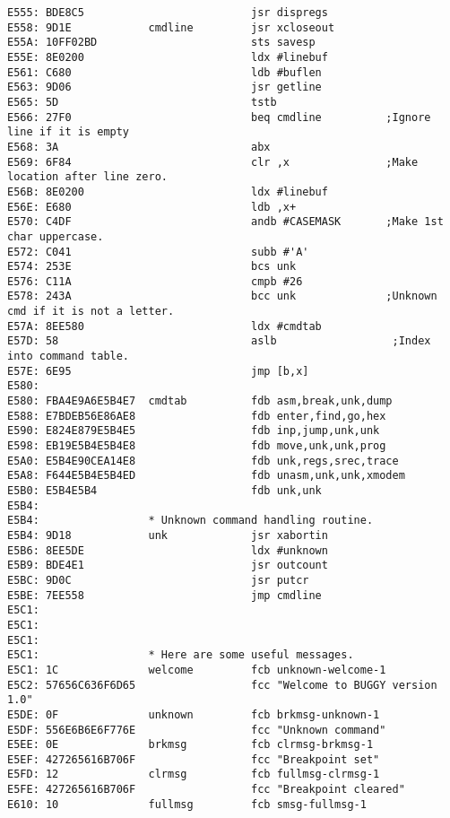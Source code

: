 {\begin{verbatim}
E555: BDE8C5                          jsr dispregs         
E558: 9D1E            cmdline         jsr xcloseout
E55A: 10FF02BD                        sts savesp
E55E: 8E0200                          ldx #linebuf
E561: C680                            ldb #buflen
E563: 9D06                            jsr getline
E565: 5D                              tstb
E566: 27F0                            beq cmdline          ;Ignore line if it is empty
E568: 3A                              abx
E569: 6F84                            clr ,x               ;Make location after line zero.
E56B: 8E0200                          ldx #linebuf
E56E: E680                            ldb ,x+
E570: C4DF                            andb #CASEMASK       ;Make 1st char uppercase.
E572: C041                            subb #'A'            
E574: 253E                            bcs unk
E576: C11A                            cmpb #26
E578: 243A                            bcc unk              ;Unknown cmd if it is not a letter.
E57A: 8EE580                          ldx #cmdtab
E57D: 58                              aslb                  ;Index into command table.
E57E: 6E95                            jmp [b,x]
E580:                 
E580: FBA4E9A6E5B4E7  cmdtab          fdb asm,break,unk,dump
E588: E7BDEB56E86AE8                  fdb enter,find,go,hex
E590: E824E879E5B4E5                  fdb inp,jump,unk,unk
E598: EB19E5B4E5B4E8                  fdb move,unk,unk,prog
E5A0: E5B4E90CEA14E8                  fdb unk,regs,srec,trace
E5A8: F644E5B4E5B4ED                  fdb unasm,unk,unk,xmodem
E5B0: E5B4E5B4                        fdb unk,unk
E5B4:                 
E5B4:                 * Unknown command handling routine.
E5B4: 9D18            unk             jsr xabortin
E5B6: 8EE5DE                          ldx #unknown
E5B9: BDE4E1                          jsr outcount
E5BC: 9D0C                            jsr putcr
E5BE: 7EE558                          jmp cmdline
E5C1:                 
E5C1:                 
E5C1:                 
E5C1:                 * Here are some useful messages.
E5C1: 1C              welcome         fcb unknown-welcome-1
E5C2: 57656C636F6D65                  fcc "Welcome to BUGGY version 1.0"
E5DE: 0F              unknown         fcb brkmsg-unknown-1
E5DF: 556E6B6E6F776E                  fcc "Unknown command"
E5EE: 0E              brkmsg          fcb clrmsg-brkmsg-1
E5EF: 427265616B706F                  fcc "Breakpoint set"
E5FD: 12              clrmsg          fcb fullmsg-clrmsg-1
E5FE: 427265616B706F                  fcc "Breakpoint cleared"
E610: 10              fullmsg         fcb smsg-fullmsg-1

\end{verbatim}}
